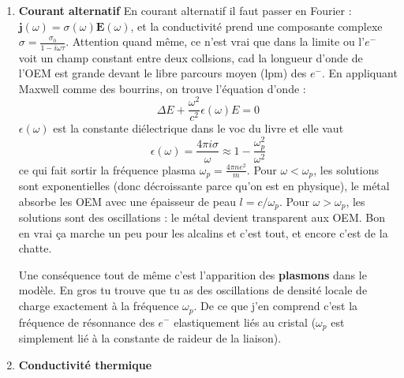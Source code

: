 \documentclass[a4paper]{report}
\begin{document}
\begin{enumerate}
 \item \textbf{Courant alternatif} En courant alternatif il faut passer en Fourier : $\mathbf{j}(\omega)=\sigma(\omega)\mathbf{E}(\omega)$, et la conductivité prend une composante complexe $\sigma=\frac{\sigma_0}{1-i\omega\tau}$. Attention quand même, ce n'est vrai que dans la limite ou l'$e^-$ voit un champ constant entre deux collsions, cad la longueur d'onde de l'OEM est grande devant le libre parcours moyen (lpm) des $e^-$. En appliquant Maxwell comme des bourrins, on trouve l'équation d'onde :
 \begin{equation}
 \Delta E + \frac{\omega^2}{c^2} \epsilon(\omega) E =0
 \end{equation}
 $\epsilon(\omega)$ est la constante diélectrique dans le voc du livre et elle vaut $$ \epsilon(\omega)= \frac{4\pi i \sigma}{\omega} \approx 1-\frac{\omega_p^2}{\omega^2}$$ ce qui fait sortir la fréquence plasma $\omega_p=\frac{4\pi n e^2}{m}$. Pour $\omega < \omega_p$, les solutions sont exponentielles (donc décroissante parce qu'on est en physique), le métal absorbe les OEM avec une épaisseur de peau $l=c/\omega_p$. Pour $\omega > \omega_p$, les solutions sont des oscillations : le métal devient transparent aux OEM.
 Bon en vrai ça marche un peu pour les alcalins et c'est tout, et encore c'est de la chatte.
 
 Une conséquence tout de même c'est l'apparition des \textbf{plasmons} dans le modèle. En gros tu trouve que tu as des oscillations de densité locale de charge exactement à la fréquence $\omega_p$. De ce que j'en comprend c'est la fréquence de résonnance des $e^-$ elastiquement liés au cristal ($\omega_p$ est simplement lié à la constante de raideur de la liaison).
 
 \item \textbf{Conductivité thermique}
 
   \end{enumerate}
  
\end{document}
